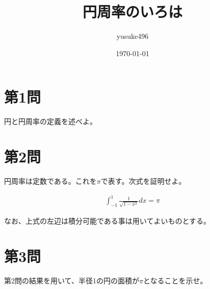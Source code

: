 \documentclass[11pt,a4paper]{jsarticle}
\title{円周率のいろは}
\author{yusuke496}
\date{\today}
\begin{document}
\maketitle

\section*{第1問}
円と円周率の定義を述べよ。

\section*{第2問}
円周率は定数である。これを$\pi$で表す。次式を証明せよ。

\begin{eqnarray}
\int_{-1}^{1}\frac{1}{\sqrt{1-x^2}}dx=\pi \nonumber
\end{eqnarray}

なお、上式の左辺は積分可能である事は用いてよいものとする。

\section*{第3問}
第2問の結果を用いて、半径1の円の面積が$\pi$となることを示せ。
  
\end{document}
